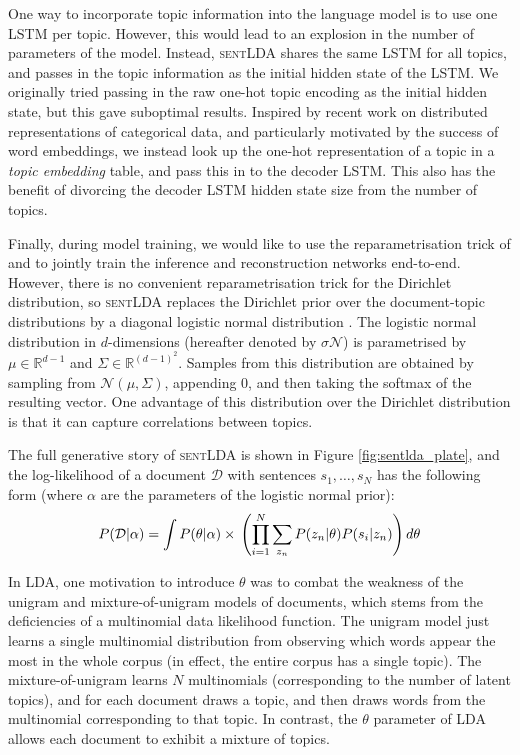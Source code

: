 One way to incorporate topic information into the language model is to use one LSTM per topic. However, this would lead to an explosion in the number of parameters of the model. Instead, \textsc{sentLDA} shares the same LSTM for all topics, and passes in the topic information as the initial hidden state of the LSTM. We originally tried passing in the raw one-hot topic encoding as the initial hidden state, but this gave suboptimal results. Inspired by recent work on distributed representations of categorical data, and particularly motivated by the success of word embeddings, we instead look up the one-hot representation of a topic in a \textit{topic embedding} table, and pass this in to the decoder LSTM. This also has the benefit of divorcing the decoder LSTM hidden state size from the number of topics.

Finally, during model training, we would like to use the reparametrisation trick of \citet{Kingma:14} and \citet{Rezende:14} to jointly train the inference and reconstruction networks end-to-end. However, there is no convenient reparametrisation trick for the Dirichlet distribution, so \textsc{sentLDA} replaces the Dirichlet prior over the document-topic distributions by a diagonal logistic normal distribution \citep{Mackay:98,Hennig:12,Strivastava:17}. The logistic normal distribution in $d$-dimensions (hereafter denoted by $\sigma \mathcal{N}$) is parametrised by $\mu \in \mathbb{R}^{d-1}$ and $\Sigma \in \mathbb{R}^{(d-1)^2}$. Samples from this distribution are obtained by sampling from $\mathcal{N}(\mu, \Sigma)$, appending 0, and then taking the softmax of the resulting vector. One advantage of this distribution over the Dirichlet distribution is that it can capture correlations between topics.

The full generative story of \textsc{sentLDA} is shown in Figure \ref{fig:sentlda_plate}, and the log-likelihood of a document $\mathcal{D}$ with sentences $s_1, \dots, s_N$ has the following form (where $\alpha$ are the parameters of the logistic normal prior):
\vspace{-1em}
\begin{dmath}
P(\mathcal{D} | \alpha) = \int P(\theta | \alpha) \times \\ \left ( \prod_{i=1}^N \sum_{z_n} P(z_n | \theta) P(s_i|z_n) \right ) d\theta
\end{dmath}

In LDA, one motivation to introduce $\theta$ was to combat the weakness of the unigram and mixture-of-unigram models \citep{Nigam:00} of documents, which stems from the deficiencies of a multinomial data likelihood function. The unigram model just learns a single multinomial distribution from observing which words appear the most in the whole corpus (in effect, the entire corpus has a single topic). The mixture-of-unigram learns $N$ multinomials (corresponding to the number of latent topics), and for each document draws a topic, and then draws words from the multinomial corresponding to that topic. In contrast, the $\theta$ parameter of LDA allows each document to exhibit a mixture of topics.

